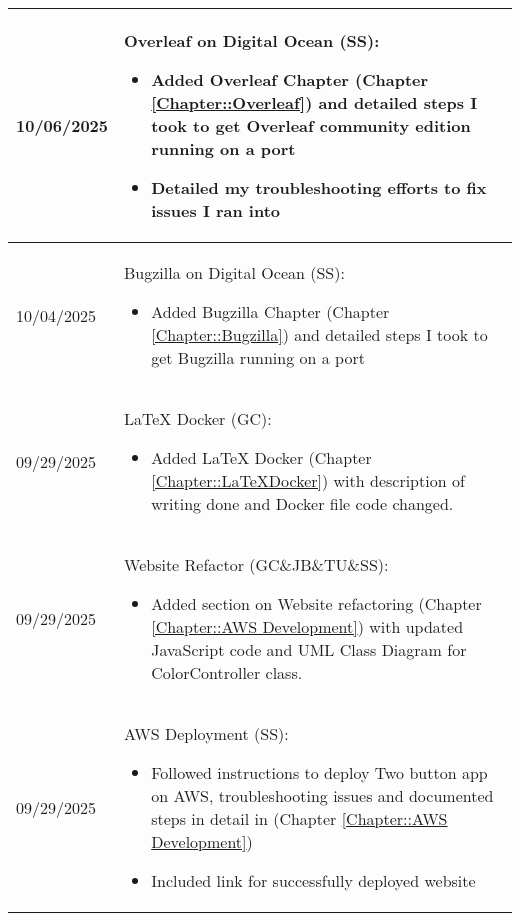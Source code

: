 \begin{longtable}{|l||p{13.5cm}|}
10/06/2025 & Overleaf on Digital Ocean (SS):
\begin{itemize}[topsep=0pt,itemsep=0pt,parsep=0pt,partopsep=0pt,leftmargin=12pt]
\item Added Overleaf Chapter (Chapter \ref{Chapter::Overleaf}) and detailed steps I took to get Overleaf community edition running on a port 
\item Detailed my troubleshooting efforts to fix issues I ran into 
\end{itemize} 
\\ \hline

10/04/2025 & Bugzilla on Digital Ocean (SS):
\begin{itemize}[topsep=0pt,itemsep=0pt,parsep=0pt,partopsep=0pt,leftmargin=12pt]
\item Added Bugzilla Chapter (Chapter \ref{Chapter::Bugzilla}) and detailed steps I took to get Bugzilla running on a port 
\end{itemize} 
\\ \hline

09/29/2025 & LaTeX Docker (GC):
\begin{itemize}[topsep=0pt,itemsep=0pt,parsep=0pt,partopsep=0pt,leftmargin=12pt]
\item Added LaTeX Docker (Chapter \ref{Chapter::LaTeXDocker}) with description of writing done and Docker file code changed.
\end{itemize} 
\\ \hline

09/29/2025 & Website Refactor (GC\&JB\&TU\&SS):
\begin{itemize}[topsep=0pt,itemsep=0pt,parsep=0pt,partopsep=0pt,leftmargin=12pt]
\item Added section on Website refactoring (Chapter \ref{Chapter::AWS Development}) with updated JavaScript code and UML Class Diagram for ColorController class.
\end{itemize} 
\\ \hline

09/29/2025 & AWS Deployment (SS):
\begin{itemize}[topsep=0pt,itemsep=0pt,parsep=0pt,partopsep=0pt,leftmargin=12pt]
\item Followed instructions to deploy Two button app on AWS, troubleshooting issues and documented steps in detail in (Chapter \ref{Chapter::AWS Development})
\item Included link for successfully deployed website
\end{itemize} 
\\ \hline


\end{longtable}
